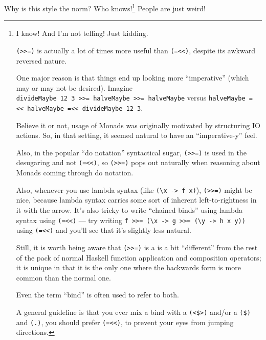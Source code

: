 \documentclass[]{article}
\begin{document}
Why is this style the norm? Who knows!\footnote{I know! And I'm not telling!
  Just kidding.

  \texttt{(\textgreater{}\textgreater{}=)} is actually a lot of times more
  useful than \texttt{(=\textless{}\textless{})}, despite its awkward reversed
  nature.

  One major reason is that things end up looking more ``imperative'' (which may
  or may not be desired). Imagine
  \texttt{divideMaybe\ 12\ 3\ \textgreater{}\textgreater{}=\ halveMaybe\ \textgreater{}\textgreater{}=\ halveMaybe}
  versus
  \texttt{halveMaybe\ =\textless{}\textless{}\ halveMaybe\ =\textless{}\textless{}\ divideMaybe\ 12\ 3}.

  Believe it or not, usage of Monads was originally motivated by structuring IO
  actions. So, in that setting, it seemed natural to have an ``imperative-y''
  feel.

  Also, in the popular ``do notation'' syntactical sugar,
  \texttt{(\textgreater{}\textgreater{}=)} is used in the desugaring and not
  \texttt{(=\textless{}\textless{})}, so
  \texttt{(\textgreater{}\textgreater{}=)} pops out naturally when reasoning
  about Monads coming through do notation.

  Also, whenever you use lambda syntax (like
  \texttt{(\textbackslash{}x\ -\textgreater{}\ f\ x)}),
  \texttt{(\textgreater{}\textgreater{}=)} might be nice, because lambda syntax
  carries some sort of inherent left-to-rightness in it with the arrow. It's
  also tricky to write ``chained binds'' using lambda syntax using
  \texttt{(=\textless{}\textless{})} --- try writing
  \texttt{f\ \textgreater{}\textgreater{}=\ (\textbackslash{}x\ -\textgreater{}\ g\ \textgreater{}\textgreater{}=\ (\textbackslash{}y\ -\textgreater{}\ h\ x\ y))}
  using \texttt{(=\textless{}\textless{})} and you'll see that it's slightly
  less natural.

  Still, it is worth being aware that \texttt{(\textgreater{}\textgreater{}=)}
  is a is a bit ``different'' from the rest of the pack of normal Haskell
  function application and composition operators; it is unique in that it is the
  only one where the backwards form is more common than the normal one.

  Even the term ``bind'' is often used to refer to both.

  A general guideline is that you ever mix a bind with a
  \texttt{(\textless{}\$\textgreater{})} and/or a \texttt{(\$)} and
  \texttt{(.)}, you should prefer \texttt{(=\textless{}\textless{})}, to prevent
  your eyes from jumping directions.} People are just weird!
\end{document}
